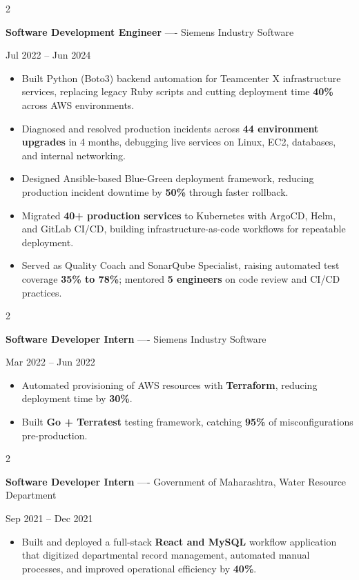 \documentclass[10pt, letterpaper]{article}
\newenvironment{highlights}{
    \begin{itemize}[
        topsep=0.10 cm,
        parsep=0.06 cm,
        partopsep=0pt,
        itemsep=0.06 cm,
        leftmargin=12pt
    ]
}{
    \end{itemize}
}
\newenvironment{twocolentry}[2][]{
    \onecolentry
    \def\secondColumn{#2}
    \setcolumnwidth{\fill, 4.5 cm}
    \begin{paracol}{2}
}{
    \switchcolumn \raggedleft \secondColumn
    \end{paracol}
    \endonecolentry
}
\begin{document}
\vspace{0.15 cm}

\begin{twocolentry}{Jul 2022 -- Jun 2024}
\textbf{Software Development Engineer} ---- Siemens Industry Software
\end{twocolentry}
\begin{highlights}
  \item Built Python (Boto3) backend automation for Teamcenter X infrastructure services, replacing legacy Ruby scripts and cutting deployment time \textbf{40\%} across AWS environments.
  \item Diagnosed and resolved production incidents across \textbf{44 environment upgrades} in 4 months, debugging live services on Linux, EC2, databases, and internal networking.
  \item Designed Ansible-based Blue-Green deployment framework, reducing production incident downtime by \textbf{50\%} through faster rollback.
  \item Migrated \textbf{40+ production services} to Kubernetes with ArgoCD, Helm, and GitLab CI/CD, building infrastructure-as-code workflows for repeatable deployment.
  \item Served as Quality Coach and SonarQube Specialist, raising automated test coverage \textbf{35\% to 78\%}; mentored \textbf{5 engineers} on code review and CI/CD practices.
\end{highlights}

\vspace{0.15 cm}

\begin{twocolentry}{Mar 2022 -- Jun 2022}
\textbf{Software Developer Intern} ---- Siemens Industry Software
\end{twocolentry}
\begin{highlights}
  \item Automated provisioning of AWS resources with \textbf{Terraform}, reducing deployment time by \textbf{30\%}.
  \item Built \textbf{Go + Terratest} testing framework, catching \textbf{95\%} of misconfigurations pre-production.
\end{highlights}

\vspace{0.15 cm}

\begin{twocolentry}{Sep 2021 -- Dec 2021}
\textbf{Software Developer Intern} ---- Government of Maharashtra, Water Resource Department
\end{twocolentry}
\begin{highlights}
  \item Built and deployed a full-stack \textbf{React and MySQL} workflow application that digitized departmental record management, automated manual processes, and improved operational efficiency by \textbf{40\%}.
\end{highlights}
\end{document}
